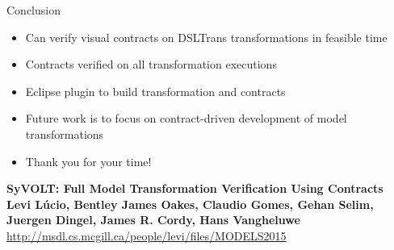 \documentclass[xcolor=dvipsnames, 12pt, handout]{beamer}
\begin{document}
\begin{frame}{Conclusion}
\begin{itemize}[<+->]
\item Can verify visual contracts on DSLTrans transformations in feasible time
\item Contracts verified on all transformation executions
\item Eclipse plugin to build transformation and contracts
\item Future work is to focus on contract-driven development of model transformations
\end{itemize}
\pause
\begin{itemize}
\item Thank you for your time!
\end{itemize}
\begin{center}
\textbf{SyVOLT: Full Model Transformation Verification Using Contracts}\\
\textbf{Levi L\'{u}cio, \textbf{Bentley James Oakes}, Claudio Gomes, Gehan Selim, Juergen Dingel, James R. Cordy, Hans Vangheluwe}\\
\url{http://msdl.cs.mcgill.ca/people/levi/files/MODELS2015}

\end{center}
\end{frame}
\end{document}
